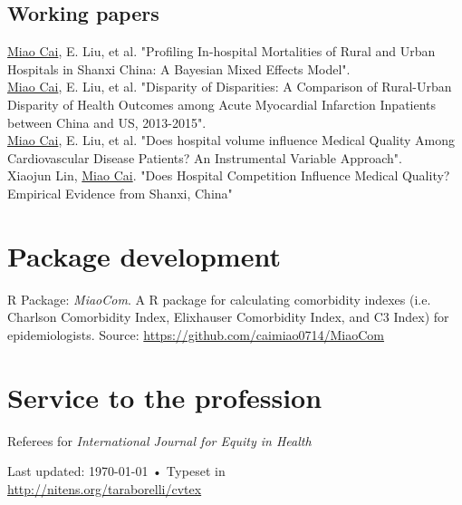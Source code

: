 \documentclass[11pt, a4paper]{article}
\begin{document}
\subsection*{Working papers}
\noindent
\underline{Miao Cai}, E. Liu, et al. "Profiling In-hospital Mortalities of Rural and Urban Hospitals in Shanxi China: A Bayesian Mixed Effects Model".\\
\underline{Miao Cai}, E. Liu, et al. "Disparity of Disparities: A Comparison of Rural-Urban Disparity of Health Outcomes among Acute Myocardial Infarction Inpatients between China and US, 2013-2015".\\
\underline{Miao Cai}, E. Liu, et al. "Does hospital volume influence Medical Quality Among Cardiovascular Disease Patients? An Instrumental Variable Approach".\\
Xiaojun Lin, \underline{Miao Cai}. "Does Hospital Competition Influence Medical Quality? Empirical Evidence from Shanxi, China"

\section*{Package development}
R Package: \emph{MiaoCom}. A R package for calculating comorbidity indexes (i.e. Charlson Comorbidity Index, Elixhauser Comorbidity Index, and C3 Index) for epidemiologists. Source: \href{https://github.com/caimiao0714/MiaoCom}{https://github.com/caimiao0714/MiaoCom}

\section*{Service to the profession}
Referees for \emph{International Journal for Equity in Health}

\vfill{}

\begin{center}
{\scriptsize  Last updated: \today\- •\- 
Typeset in \href{http://nitens.org/taraborelli/cvtex}{
\XeTeX }\\
\href{http://nitens.org/taraborelli/cvtex}{http://nitens.org/taraborelli/cvtex}}
\end{center}
\end{document}
